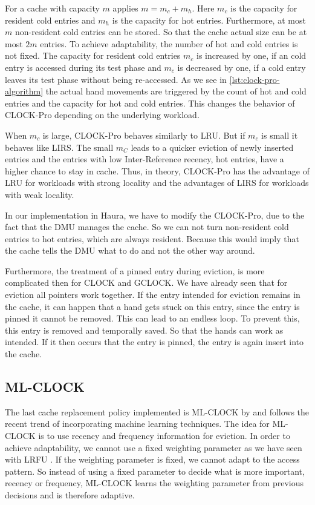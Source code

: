 \documentclass[
	12pt,
	a4paper,
	abstract,
	bibliography=totoc,
	chapterprefix,
	headings=openright,
	numbers=endperiod,
	parskip=half,
	twoside,
]{scrreprt}
\begin{document}
For a cache with capacity $m$ applies $m = m_c + m_h$.
Here $m_c$ is the capacity for resident cold entries and $m_h$ is the capacity for hot entries.
Furthermore, at most $m$ non-resident cold entries can be stored.
So that the cache actual size can be at most $2m$ entries.
To achieve adaptability, the number of hot and cold entries is not fixed.
The capacity for resident cold entries $m_c$ is increased by one, if an cold entry is accessed during its test phase 
and $m_c$ is decreased by one, if a cold entry leaves its test phase without being re-accessed.
As we see in \cref{lst:clock-pro-algorithm} the actual hand movements are triggered by the count of hot and cold entries and the 
capacity for hot and cold entries.
This changes the behavior of CLOCK-Pro depending on the underlying workload.

When $m_c$ is large, CLOCK-Pro behaves similarly to LRU. But if $m_c$ is small it behaves like LIRS.
The small $m_C$ leads to a quicker eviction of newly inserted entries and the entries with low Inter-Reference recency, 
hot entries, have a higher 
chance to stay in cache. Thus, in theory, CLOCK-Pro has the advantage of LRU for workloads with strong locality and 
the advantages of LIRS for workloads with weak locality.

In our implementation in Haura, we have to modify the CLOCK-Pro, due to the fact that the DMU manages the cache.
So we can not turn non-resident cold entries to hot entries, which are always resident.
Because this would imply that the cache tells the DMU what to do and not the other way around.

Furthermore, the treatment of a pinned entry during eviction, is more complicated then for CLOCK and GCLOCK.
We have already seen that for eviction all pointers work together. If the entry intended for eviction remains in the cache, it can happen that a 
hand gets stuck on this entry, since the entry is pinned it cannot be removed. This can lead to an endless loop. To prevent this, this entry is 
removed and temporally saved. So that the hands can work as intended.
If it then occurs that the entry is pinned, the entry is again insert into the cache.

\subsection{ML-CLOCK}
\label{sub:ml-clock}

The last cache replacement policy implemented is ML-CLOCK by \cite{cho2021ml} and 
follows the recent trend of incorporating machine learning techniques.
The idea for ML-CLOCK is to use recency and frequency information for eviction.
In order to achieve adaptability, we cannot use a fixed weighting parameter as we have seen with LRFU \cite{lee2001lrfu}. 
If the weighting parameter is fixed, we cannot adapt to the access pattern.
So instead of using a fixed parameter to decide what is more important, recency 
or frequency,
ML-CLOCK learns the weighting parameter from previous decisions and is therefore adaptive.
\end{document}
